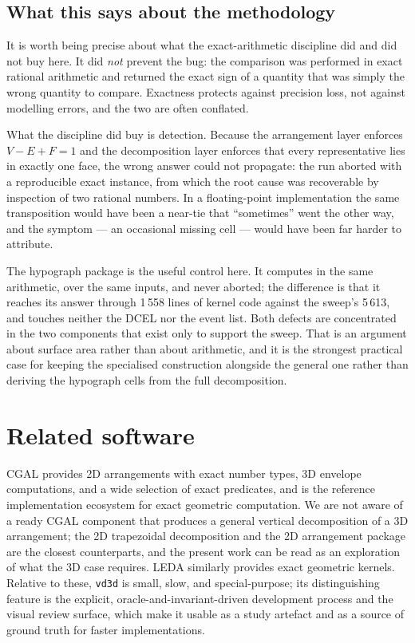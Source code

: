 \documentclass[11pt]{article}
\begin{document}
\subsection{What this says about the methodology}

It is worth being precise about what the exact-arithmetic discipline did and
did not buy here.  It did \emph{not} prevent the bug: the comparison was
performed in exact rational arithmetic and returned the exact sign of a
quantity that was simply the wrong quantity to compare.  Exactness protects
against precision loss, not against modelling errors, and the two are often
conflated.

What the discipline did buy is detection.  Because the arrangement layer
enforces $V - E + F = 1$ and the decomposition layer enforces that every
representative lies in exactly one face, the wrong answer could not propagate:
the run aborted with a reproducible exact instance, from which the root cause
was recoverable by inspection of two rational numbers.  In a floating-point
implementation the same transposition would have been a near-tie that
``sometimes'' went the other way, and the symptom --- an occasional missing
cell --- would have been far harder to attribute.

The hypograph package is the useful control here.  It computes in the same
arithmetic, over the same inputs, and never aborted; the difference is that it
reaches its answer through 1\,558 lines of kernel code against the sweep's
5\,613, and touches neither the DCEL nor the event list.  Both defects are concentrated in the two components
that exist only to support the sweep.  That is an argument about surface area
rather than about arithmetic, and it is the strongest practical case for keeping
the specialised construction alongside the general one rather than deriving the
hypograph cells from the full decomposition.

\section{Related software}

CGAL \cite{cgal} provides 2D arrangements with exact number types, 3D envelope
computations, and a wide selection of exact predicates, and is the reference
implementation ecosystem for exact geometric computation.  We are not aware of
a ready CGAL component that produces a general vertical decomposition of a 3D
arrangement; the 2D trapezoidal decomposition and the 2D arrangement package
are the closest counterparts, and the present work can be read as an
exploration of what the 3D case requires.  LEDA \cite{leda} similarly provides
exact geometric kernels.  Relative to these, \texttt{vd3d} is small, slow, and
special-purpose; its distinguishing feature is the explicit,
oracle-and-invariant-driven development process and the visual review surface,
which make it usable as a study artefact and as a source of ground truth for
faster implementations.
\end{document}
